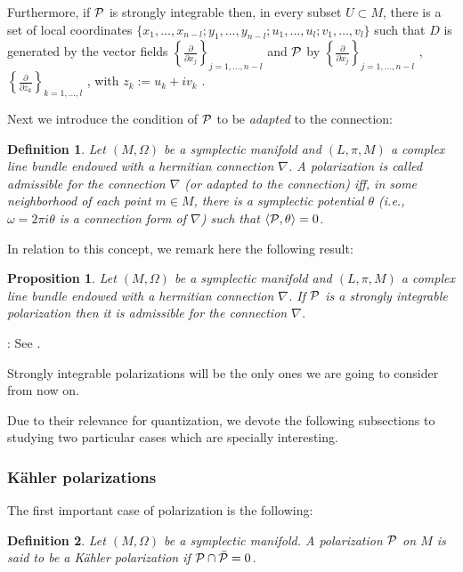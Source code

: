 \documentclass[12pt]{article}
\theoremstyle{plain}
\newtheorem{prop}{Proposition}
\newtheorem{definition}{Definition}
\def\dst{\(}
\def\derpar#1#2{\frac{\partial{#1}}{\partial{#2}}}
\def\qed{\ifvmode\removelastskip\fi
{\unskip\nobreak\hfil\penalty50\hbox{}\nobreak\hfil
\hbox{\vrule height1.2ex width1.2ex}\parfillskip=0pt
\finalhyphendemerits=0 \par\smallskip}}
\def\P{{\cal P}}
\begin{document}
Furthermore, if $\P$ is strongly integrable then,
in every subset $U \subset M$,
there is a set of local coordinates
$\{ x_1, \ldots ,x_{n-l};y_1,\ldots ,y_{n-l};
u_1,\ldots ,u_l;v_1,\ldots ,v_l \}$
such that $D$ is generated by the vector fields
\dst\left\{ \derpar{}{x_j} \right\}_{j=1,\ldots ,n-l}\)
and $\P$ by  \dst\left\{ \derpar{}{x_j} \right\}_{j=1,\ldots ,n-l}\) ,
\dst\left\{ \derpar{}{\bar z_k} \right\}_{k=1,\ldots ,l}\) ,
with $z_k := u_k + i v_k$ \cite{Ki-76}.

Next we introduce the condition of $\P$ to be {\it adapted} to the
connection:

\begin{definition}
Let $(M,\Omega )$ be a symplectic manifold and $(L,\pi ,M)$ a
complex line bundle endowed with a hermitian connection $\nabla$.
A polarization is called {\rm admissible} for the connection
$\nabla$ (or {\rm adapted} to the connection) iff, in some
neighborhood of each point $m \in M$, there is a symplectic
potential $\theta$ (i.e., $\omega = 2\pi i \theta$ is a connection
form of $\nabla$) such that $\langle \P ,\theta \rangle = 0$.
\end{definition}

In relation to this concept, we remark here the following result:

\begin{prop}
Let $(M,\Omega )$ be a symplectic manifold
and $(L,\pi ,M)$ a complex line bundle
endowed with a hermitian connection $\nabla$.
If $\P$ is a strongly integrable polarization
then it is admissible for the connection $\nabla$.
\end{prop}
: 
See \cite{Ra-77}.
\qed

Strongly integrable polarizations
will be the only ones
we are going to consider from now on.

Due to their relevance for quantization,
we devote the following subsections to studying
two particular cases which are specially interesting.


\subsubsection{K\"ahler polarizations}
\protect \label{Kpol}


The first important case of polarization is the following:

\begin{definition}
Let $(M,\Omega )$ be a symplectic manifold.
A polarization $\P$ on $M$ is said to be a
{\rm K\"ahler polarization} if $\P \cap \bar \P = 0$.
\end{definition}
\end{document}
